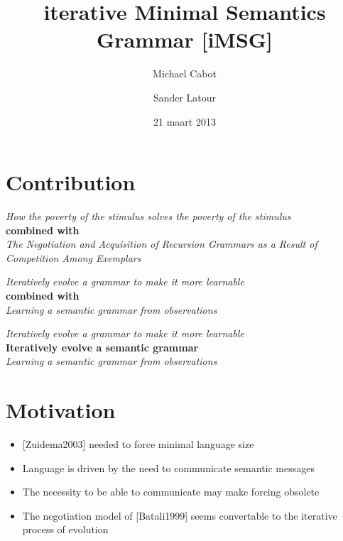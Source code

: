 \documentclass[11pt,a4paper,xcolor=dvipsnames]{beamer}
\author[Michael Cabot \and Sander Latour]{Michael Cabot \and Sander Latour}
\institute{University of Amsterdam}
\title[iMSG]{iterative Minimal Semantics Grammar [iMSG]}
\date{21 maart 2013}
\begin{document}
\begin{frame}
\titlepage
\end{frame}

\begin{frame}
\tableofcontents
\end{frame}

\section{Contribution}
\begin{frame}
  \begin{center}
    \textit{How the poverty of the stimulus solves the poverty of the stimulus}\\
    \vfill
    \textbf{combined with}\\
    \vfill
    \textit{The Negotiation and Acquisition of Recursion Grammars as a Result of Competition Among Exemplars}
  \end{center}
\end{frame}

\begin{frame}
  \begin{center}
    \textit{Iteratively evolve a grammar to make it more learnable}\\
    \vfill
    \textbf{combined with}\\
    \vfill
    \textit{Learning a semantic grammar from observations}
  \end{center}
\end{frame}

\begin{frame}
  \begin{center}
    \textit{Iteratively evolve a grammar to make it more learnable}\\
    \vfill
    \textbf{Iteratively evolve a semantic grammar}\\
    \vfill
    \textit{Learning a semantic grammar from observations}
  \end{center}
\end{frame}

\section{Motivation}
\begin{frame}
  \begin{itemize}
    \item \hspace*{0pt}[Zuidema2003] needed to force minimal language size
    \item Language is driven by the need to communicate semantic messages
    \item The necessity to be able to communicate may make forcing obsolete
    \item The negotiation model of [Batali1999] seems convertable to the iterative process of evolution
  \end{itemize}
\end{frame}
\end{document}
